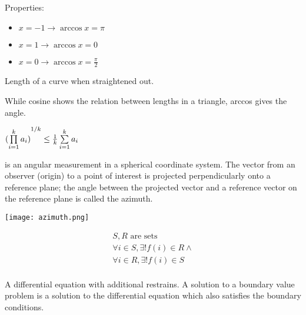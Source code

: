 \begin{definition}[arccos]\label{arccos}
    Properties:
    \begin{itemize}
        \item $ x = -1 \rightarrow \arccos{x} = \pi$
        \item $ x = 1 \rightarrow \arccos{x} = 0$
        \item $ x = 0 \rightarrow \arccos{x} = \frac{\pi}{2}$
    \end{itemize}
\end{definition}

\begin{definition}
    Length of a curve when straightened out.
\end{definition}
\begin{definition}[arccos]
    While cosine shows the relation between lengths in a triangle, 
    arccos gives the angle.
\end{definition}

\begin{definition}\label{arigeo}
    $
    \newline {(\prod\limits_{i = 1}^{k} a_{i})}^{1/k}
    \leq {1 \over k} \sum\limits_{i = 1}^{k} a_{i}
    $
\end{definition}

\begin{definition}[Azimuth]
     is an angular measurement in a spherical coordinate system. The vector
     from an observer (origin) to a point of interest is projected
     perpendicularly onto a reference plane; the angle between the projected
     vector and a reference vector on the reference plane is called the
     azimuth.

     \texttt{[image: azimuth.png]}

\end{definition}

\begin{definition}[Bijection]
    \begin{align}
        S,R \text{\ are sets} \\
        \forall{i \in S}, \exists!{f(i) \in R} \wedge \\
        \forall{i \in R}, \exists!{f(i) \in S} \\
    \end{align}
\end{definition}

\begin{definition}
    A differential equation with additional restrains. A solution to a boundary
    value problem is a solution to the differential equation which also
    satisfies the boundary conditions.
    
\end{definition}


